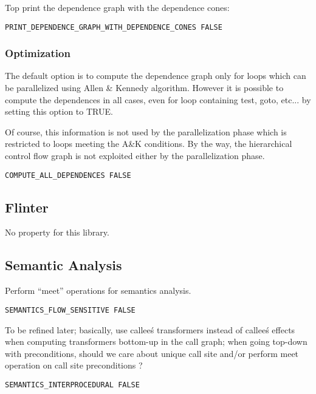 Top print the dependence graph with the dependence cones:

\begin{verbatim}
PRINT_DEPENDENCE_GRAPH_WITH_DEPENDENCE_CONES FALSE
\end{verbatim}

\subsubsection{Optimization}

The default option is to compute the dependence graph only for loops
which can be parallelized using Allen \& Kennedy algorithm.  However it
is possible to compute the dependences in all cases, even for loop
containing test, goto, etc...  by setting this option to TRUE.

Of course, this information is not used by the parallelization phase
which is restricted to loops meeting the A\&K conditions. By the way,
the hierarchical control flow graph is not exploited either by the
parallelization phase.

\begin{verbatim}
COMPUTE_ALL_DEPENDENCES FALSE
\end{verbatim}

\subsection{Flinter}

No property for this library.

\subsection{Semantic Analysis}
\label{subsection-semantic-analysis}

Perform ``meet'' operations for semantics analysis.

\begin{verbatim}
SEMANTICS_FLOW_SENSITIVE FALSE
\end{verbatim}

To be refined later; basically, use callee\'s transformers instead of
callee\'s effects when computing transformers bottom-up in the call graph;
when going top-down with preconditions, should we care about unique
call site and/or perform meet operation on call site preconditions ?

\begin{verbatim}
SEMANTICS_INTERPROCEDURAL FALSE
\end{verbatim}

